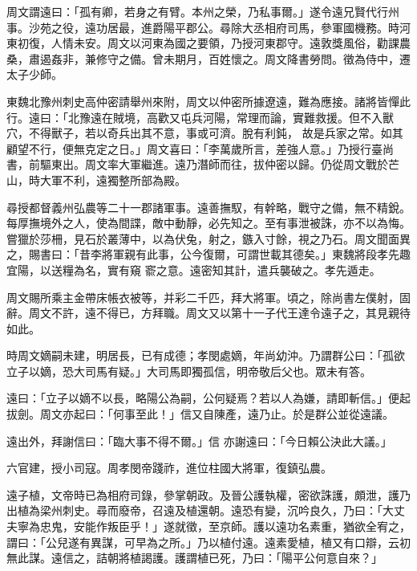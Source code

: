 \begin{pinyinscope}
 周文謂遠曰：「孤有卿，若身之有臂。本州之榮，乃私事爾。」遂令遠兄賢代行州事。沙苑之役，遠功居最，進爵陽平郡公。尋除大丞相府司馬，參軍國機務。時河東初復，人情未安。周文以河東為國之要領，乃授河東郡守。遠敦獎風俗，勸課農桑，肅遏姦非，兼修守之備。曾未期月，百姓懷之。周文降書勞問。徵為侍中，遷太子少師。



 東魏北豫州刺史高仲密請舉州來附，周文以仲密所據遼遠，難為應接。諸將皆憚此行。遠曰：「北豫遠在賊境，高歡又屯兵河陽，常理而論，實難救援。但不入獸穴，不得獸子，若以奇兵出其不意，事或可濟。脫有利鈍，
 故是兵家之常。如其顧望不行，便無克定之日。」周文喜曰：「李萬歲所言，差強人意。」乃授行臺尚書，前驅東出。周文率大軍繼進。遠乃潛師而往，拔仲密以歸。仍從周文戰於芒山，時大軍不利，遠獨整所部為殿。



 尋授都督義州弘農等二十一郡諸軍事。遠善撫馭，有幹略，戰守之備，無不精銳。每厚撫境外之人，使為間諜，敵中動靜，必先知之。至有事泄被誅，亦不以為悔。嘗獵於莎柵，見石於叢薄中，以為伏兔，射之，鏃入寸餘，視之乃石。周文聞面異之，賜書曰：「昔李將軍親有此事，公今復爾，可謂世載其德矣。」東魏將段孝先趣宜陽，以送糧為名，實有窺
 窬之意。遠密知其計，遣兵襲破之。孝先遁走。



 周文賜所乘主金帶床帳衣被等，并彩二千匹，拜大將軍。頃之，除尚書左僕射，固辭。周文不許，遠不得已，方拜職。周文又以第十一子代王達令遠子之，其見親待如此。



 時周文嫡嗣未建，明居長，已有成德；孝閔處嫡，年尚幼沖。乃謂群公曰：「孤欲立子以嫡，恐大司馬有疑。」大司馬即獨孤信，明帝敬后父也。眾未有答。



 遠曰：「立子以嫡不以長，略陽公為嗣，公何疑焉？若以人為嫌，請即斬信。」便起拔劍。周文亦起曰：「何事至此！」信又自陳產，遠乃止。於是群公並從遠議。



 遠出外，拜謝信曰：「臨大事不得不爾。」信
 亦謝遠曰：「今日賴公決此大議。」



 六官建，授小司寇。周孝閔帝踐祚，進位柱國大將軍，復鎮弘農。



 遠子植，文帝時已為相府司錄，參掌朝政。及晉公護執權，密欲誅護，頗泄，護乃出植為梁州刺史。尋而廢帝，召遠及植還朝。遠恐有變，沉吟良久，乃曰：「大丈夫寧為忠鬼，安能作叛臣乎！」遂就徵，至京師。護以遠功名素重，猶欲全宥之，謂曰：「公兒遂有異謀，可早為之所。」乃以植付遠。遠素愛植，植又有口辯，云初無此謀。遠信之，詰朝將植謁護。護謂植已死，乃曰：「陽平公何意自來？」




\end{pinyinscope}

